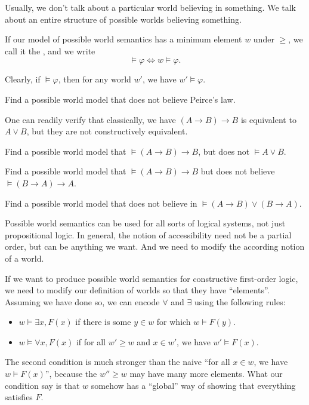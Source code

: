 \documentclass[a4paper]{article}
\begin{document}
Usually, we don't talk about a particular world believing in something. We talk about an entire structure of possible worlds believing something.
\begin{notation}
  If our model of possible world semantics has a minimum element $w$ under $\geq$, we call it the , and we write
  \[
    \vDash \varphi \Longleftrightarrow w \vDash \varphi.
  \]
\end{notation}
Clearly, if $\vDash \varphi$, then for any world $w'$, we have $w' \vDash \varphi$.

\begin{ex}
  Find a possible world model that does not believe Peirce's law.
\end{ex}

One can readily verify that classically, we have $(A \to B) \to B$ is equivalent to $A \vee B$, but they are not constructively equivalent.
\begin{ex}
  Find a possible world model that $\vDash (A \to B) \to B$, but does not $\vDash A \vee B$.
\end{ex}

\begin{ex}
  Find a possible world model that $\vDash (A \to B) \to B$ but does not believe $\vDash (B \to A) \to A$.
\end{ex}

\begin{ex}
  Find a possible world model that does not believe in $\vDash (A \to B) \vee (B \to A)$.
\end{ex}

Possible world semantics can be used for all sorts of logical systems, not just propositional logic. In general, the notion of accessibility need not be a partial order, but can be anything we want. And we need to modify the according notion of a world.

\begin{eg}
  If we want to produce possible world semantics for constructive first-order logic, we need to modify our definition of worlds so that they have ``elements''. Assuming we have done so, we can encode $\forall$ and $\exists$ using the following rules:
  \begin{itemize}
    \item $w \vDash \exists x, F(x)$ if there is some $y \in w$ for which $w \vDash F(y)$.
    \item $w \vDash \forall x, F(x)$ if for all $w' \geq w$ and $x \in w'$, we have $w' \vDash F(x)$.
  \end{itemize}
  The second condition is much stronger than the naive ``for all $x \in w$, we have $w \vDash F(x)$'', because the $w'' \geq w$ may have many more elements. What our condition say is that $w$ somehow has a ``global'' way of showing that everything satisfies $F$.
\end{eg}

\printindex
\end{document}
